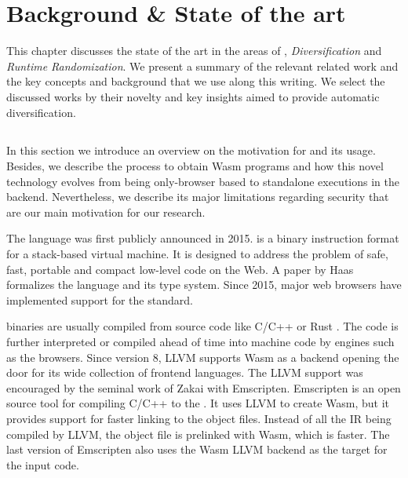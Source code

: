 \chapter{Background \& State of the art}

This chapter discusses the state of the art in the areas of \emph{\wasm}, \emph{Diversification} and \emph{Runtime Randomization}. We present a summary of the relevant related work and the key concepts and background that we use along this writing. 
We select the discussed works by their novelty and key insights aimed to provide automatic diversification. 


\section{\wasm}
\label{sota:wasm}

In this section we introduce an overview on the motivation for \wasm and its usage. Besides, we describe the process to obtain Wasm programs and how this novel technology evolves from being only-browser based to standalone executions in the backend. Nevertheless, we describe its major limitations regarding security that are our main motivation for our research.

The \wasm language was first publicly announced in 2015. \wasm is a binary instruction format for a stack-based virtual machine.
It is designed to address the problem of safe, fast, portable and compact low-level code on the Web.
A paper by Haas \etal~\cite{Haas_2017} formalizes the language and its type system.
Since 2015, major web browsers have implemented support for the standard.

\wasm binaries are usually compiled from source code like C/C++ or Rust \cite{Hilbig2021AnES}. The \wasm code is further interpreted or compiled ahead of time into machine code by engines such as the browsers. Since version 8, LLVM supports Wasm as a backend opening the door for its wide collection of frontend languages. The LLVM support was encouraged by the seminal work of Zakai \etal with Emscripten.
Emscripten is an open source tool for compiling C/C++ to the \wasm. It uses LLVM to create Wasm, but it provides support for faster linking to the object files. Instead of all the IR being compiled by LLVM, the object file is prelinked with Wasm, which is faster. The last version of Emscripten also uses the Wasm LLVM backend as the target for the input code.

